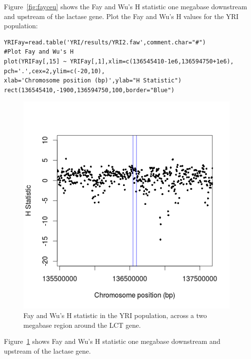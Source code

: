 \documentclass[a4paper,10pt]{article}
\begin{document}
\noindent
Figure~\ref{fig:fayceu} shows the Fay and Wu's H statistic one
megabase downstream and upstream of the lactase gene.  Plot the Fay
and Wu's H values for the YRI population:\\
\begin{verbatim}
YRIFay=read.table('YRI/results/YRI2.faw',comment.char="#")
#Plot Fay and Wu's H
plot(YRIFay[,15] ~ YRIFay[,1],xlim=c(136545410-1e6,136594750+1e6),
pch='.',cex=2,ylim=c(-20,10),
xlab='Chromosome position (bp)',ylab="H Statistic")
rect(136545410,-1900,136594750,100,border="Blue") 
\end{verbatim}
\begin{figure}
\centering
\includegraphics{pictures/YRIFay.png}
\caption{Fay and Wu's H statistic in the YRI population, across a two
  megabase region around the LCT gene.} 
\label{fig:fayyri}
\end{figure}

\noindent
Figure~\ref{fig:fayyri} shows Fay and Wu's H statistic one megabase
downstream and upstream of the lactase gene.
\end{document}
